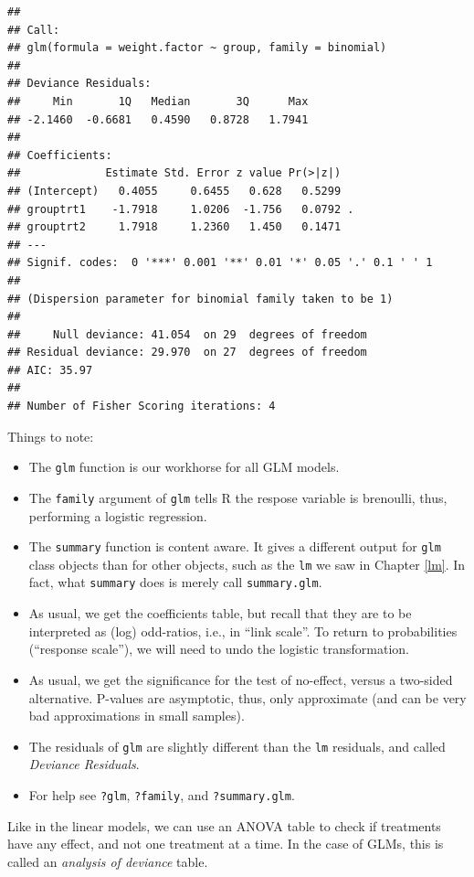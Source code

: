 \documentclass[]{book}
\providecommand{\tightlist}{%
  \setlength{\itemsep}{0pt}\setlength{\parskip}{0pt}}
\theoremstyle{definition}
\theoremstyle{definition}
\theoremstyle{definition}
\theoremstyle{remark}
\begin{document}
\begin{verbatim}
## 
## Call:
## glm(formula = weight.factor ~ group, family = binomial)
## 
## Deviance Residuals: 
##     Min       1Q   Median       3Q      Max  
## -2.1460  -0.6681   0.4590   0.8728   1.7941  
## 
## Coefficients:
##             Estimate Std. Error z value Pr(>|z|)  
## (Intercept)   0.4055     0.6455   0.628   0.5299  
## grouptrt1    -1.7918     1.0206  -1.756   0.0792 .
## grouptrt2     1.7918     1.2360   1.450   0.1471  
## ---
## Signif. codes:  0 '***' 0.001 '**' 0.01 '*' 0.05 '.' 0.1 ' ' 1
## 
## (Dispersion parameter for binomial family taken to be 1)
## 
##     Null deviance: 41.054  on 29  degrees of freedom
## Residual deviance: 29.970  on 27  degrees of freedom
## AIC: 35.97
## 
## Number of Fisher Scoring iterations: 4
\end{verbatim}

Things to note:

\begin{itemize}
\tightlist
\item
  The \texttt{glm} function is our workhorse for all GLM models.
\item
  The \texttt{family} argument of \texttt{glm} tells R the respose
  variable is brenoulli, thus, performing a logistic regression.
\item
  The \texttt{summary} function is content aware. It gives a different
  output for \texttt{glm} class objects than for other objects, such as
  the \texttt{lm} we saw in Chapter \ref{lm}. In fact, what
  \texttt{summary} does is merely call \texttt{summary.glm}.
\item
  As usual, we get the coefficients table, but recall that they are to
  be interpreted as (log) odd-ratios, i.e., in ``link scale''. To return
  to probabilities (``response scale''), we will need to undo the
  logistic transformation.
\item
  As usual, we get the significance for the test of no-effect, versus a
  two-sided alternative. P-values are asymptotic, thus, only approximate
  (and can be very bad approximations in small samples).
\item
  The residuals of \texttt{glm} are slightly different than the
  \texttt{lm} residuals, and called \emph{Deviance Residuals}.
\item
  For help see \texttt{?glm}, \texttt{?family}, and
  \texttt{?summary.glm}.
\end{itemize}

Like in the linear models, we can use an ANOVA table to check if
treatments have any effect, and not one treatment at a time. In the case
of GLMs, this is called an \emph{analysis of deviance} table.
\end{document}
